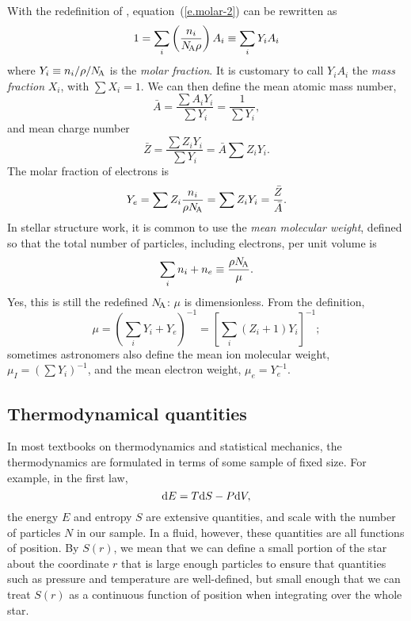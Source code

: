 With the redefinition of \NA, equation~(\ref{e.molar-2}) can be rewritten as
\begin{equation}\label{e.}
1 = \sum_{i}\left(\frac{n_{i}}{N_\mathrm{\!A}\rho}\right)A_{i} \equiv \sum_{i}Y_{i}A_{i}
\end{equation}
where $Y_{i} \equiv n_{i}/\rho/N_\mathrm{\!A}$ is the \emph{molar fraction}. It is customary to call $Y_{i}A_{i}$ the \emph{mass fraction} $X_{i}$, with $\sum X_{i} = 1$. We can then define the mean atomic mass number,
\begin{equation}\label{e.mean-A}
\bar{A} = \frac{\sum A_{i}Y_{i}}{\sum Y_{i}} = \frac{1}{\sum Y_{i}},
\end{equation}
and mean charge number
\begin{equation}\label{e.mean-Z}
\bar{Z} = \frac{\sum Z_{i}Y_{i}}{\sum Y_{i}} = \bar{A} \sum Z_{i}Y_{i}.
\end{equation}
The molar fraction of electrons is
\begin{equation}\label{e.Ye}
Y_{e} = \sum Z_{i} \frac{n_{i}}{\rho N_\mathrm{\!A}} = \sum Z_{i}Y_{i} = \frac{\bar{Z}}{\bar{A}}.
\end{equation}
In stellar structure work, it is common to use the \emph{mean molecular weight}, defined so that the total number of particles, including electrons, per unit volume is
\begin{equation}\label{e.mean-molecular-weight}
\sum_{i} n_{i} + n_{e} \equiv \frac{\rho N_\mathrm{\!A}}{\mu}.
\end{equation}
Yes, this is still the redefined $N_\mathrm{\!A}$: $\mu$ is dimensionless. From the definition,
\[
\mu = \left(\sum_{i}Y_{i} + Y_{e}\right)^{-1} = \left[ \sum_{i}\left(Z_{i}+1\right)Y_{i} \right]^{-1};
\]
sometimes astronomers also define the mean ion molecular weight, $\mu_{I} = (\sum Y_{i})^{-1}$, and the mean electron weight, $\mu_{e} = Y_{e}^{-1}$.

\subsection{Thermodynamical quantities}

In most textbooks on thermodynamics and statistical mechanics, the thermodynamics are formulated in terms of some sample of fixed size. For example, in the first law,
\begin{equation}\label{e.first-law-extensive}
\mathrm{d} E = T\mathrm{d} S - P\mathrm{d} V,
\end{equation}
the energy $E$ and entropy $S$ are extensive quantities, and scale with the number of particles $N$ in our sample. In a fluid, however, these quantities are all functions of position. By $S(r)$, we mean that we can define a small portion of the star about the coordinate $r$ that is large enough particles to ensure that quantities such as pressure and temperature are well-defined, but small enough that we can treat $S(r)$ as a continuous function of position when integrating over the whole star.

